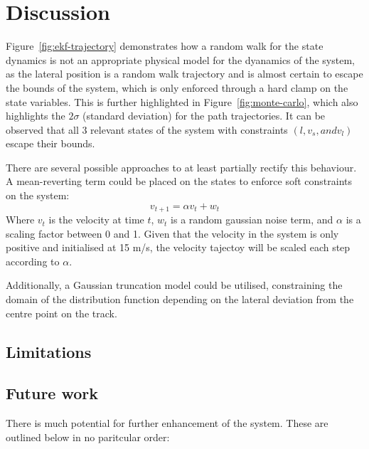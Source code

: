 \section{Discussion}
\label{sec:disc}

Figure~\ref{fig:ekf-trajectory} demonstrates how a random walk for the state dynamics is not an appropriate physical model for the dyanamics of the system, as the lateral position is a random walk trajectory and is almost certain to escape the bounds of the system, which is only enforced through a hard clamp on the state variables.
This is further highlighted in Figure~\ref{fig:monte-carlo}, which also highlights the $2\sigma$ (standard deviation) for the path trajectories. It can be observed that all 3 relevant states of the system with constraints $(l, v_s, and v_l)$ escape their bounds.

There are several possible approaches to at least partially rectify this behaviour. A mean-reverting term\cite{uhlenbeck_1930_on} could be placed on the states to enforce soft constraints on the system:
\begin{equation}
\label{eq:mean-reversion}
    v_{t+1} = \alpha v_t + w_t
\end{equation}
Where $v_t$ is the velocity at time $t$, $w_t$ is a random gaussian noise term, and $\alpha$ is a scaling factor between 0 and 1. Given that the velocity in the system is only positive and initialised at 15 m/s, the velocity tajectoy will be scaled each step according to $\alpha$.

Additionally, a Gaussian truncation model\cite{burkardt_2023_the} could be utilised, constraining the domain of the distribution function depending on the lateral deviation from the centre point on the track.

\subsection{Limitations}
\label{sec:limitations}


\subsection{Future work}
\label{sec:future-work}
There is much potential for further enhancement of the system. These are outlined below in no paritcular order:

